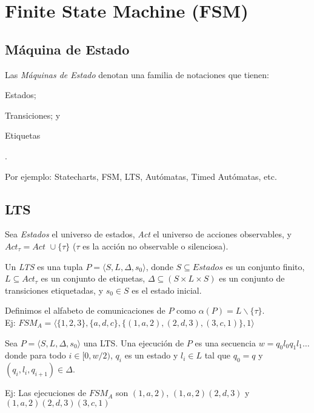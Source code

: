 \section{Finite State Machine (FSM)}

\subsection{M\'aquina de Estado} 
Las \emph{M\'aquinas de Estado} denotan una familia de notaciones que tienen: \begin{inparaenum}[(a)] \item Estados; \item Transiciones; y \item Etiquetas \end{inparaenum}.

Por ejemplo: Statecharts, FSM, LTS, Aut\'omatas, Timed Aut\'omatas, etc. 

\subsection{LTS}

\begin{definicion}[LTS]
 Sea \emph{Estados} el universo de estados, \emph{Act} el universo de acciones observables, y $\textit{Act}_\tau = \textit{Act } \cup \{\tau\}$ ($\tau$ es la acci\'on no observable o silenciosa).
 
 Un \emph{LTS} es una tupla $P = \langle S,L,\Delta,s_0 \rangle$, donde $S \subseteq \textit{Estados}$ es un conjunto finito, $L\subseteq \textit{Act}_\tau$ es un conjunto de etiquetas, $\Delta \subseteq (S \times L \times S)$ es un conjunto de transiciones etiquetadas, y $s_0 \in S$ es el estado inicial. 
 
 Definimos el alfabeto de comunicaciones de $P$ como $\alpha(P) = L \backslash \{\tau\}$. \\
 
 Ej: $FSM_A = \langle \{1,2,3\},\{a,d,c\},\{(1,a,2),(2,d,3),(3,c,1)\},1 \rangle$
\end{definicion}

\begin{definicion}[Ejecuci\'on]
 Sea $P = \langle S,L,\Delta,s_0 \rangle$ una LTS. Una ejecuci\'on de $P$ es una secuencia $w = q_0l_0q_1l_1\dots$ donde para todo $i\in[0,w/2)$, $q_i$ es un estado y $l_i\in L$ tal que $q_0 = q$ y $(q_i,l_i,q_{i+1})\in \Delta$.
 
 Ej: Las ejecuciones de $FSM_A$ son $(1,a,2)$, $(1,a,2)(2,d,3)$ y  $(1,a,2)(2,d,3)(3,c,1)$
\end{definicion}

